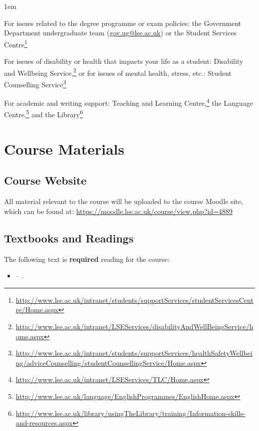 \documentclass[12pt,a4paper]{article}
\newcommand{\reading}[2][]{\noindent -- {#1}\bibentry{#2}.\vspace{.25em}\\}
\begin{document}
\begin{itemize*}\itemsep1em

\item For issues related to the degree programme or exam policies: the Government Department undergraduate team (\href{mailto:Gov.Ug@lse.ac.uk}{gov.ug@lse.ac.uk}) or the Student Services Centre\footnote{\url{http://www.lse.ac.uk/intranet/students/supportServices/studentServicesCentre/Home.aspx}}

\item For issues of disability or health that impacts your life as a student: Disability and Wellbeing Service,\footnote{\url{http://www.lse.ac.uk/intranet/LSEServices/disabilityAndWellBeingService/home.aspx}} or for issues of mental health, stress, etc.: Student Counselling Service\footnote{\url{http://www.lse.ac.uk/intranet/students/supportServices/healthSafetyWellbeing/adviceCounselling/studentCounsellingService/Home.aspx}}

\item For academic and writing support: Teaching and Learning Centre,\footnote{\url{http://www.lse.ac.uk/intranet/LSEServices/TLC/Home.aspx}} the Language Centre,\footnote{\url{http://www.lse.ac.uk/language/EnglishProgrammes/EnglishHome.aspx}} and the Library\footnote{\url{http://www.lse.ac.uk/library/usingTheLibrary/training/Information-skills-and-resources.aspx}}

\end{itemize*}

\section{Course Materials}

\subsection{Course Website}

All material relevant to the course will be uploaded to the course Moodle site, which can be found at: \url{https://moodle.lse.ac.uk/course/view.php?id=4889}

\subsection{Textbooks and Readings}

The following text is \textbf{required} reading for the course:

\begin{itemize}
\item \reading{Toshkov2016}
\end{itemize}
\end{document}
